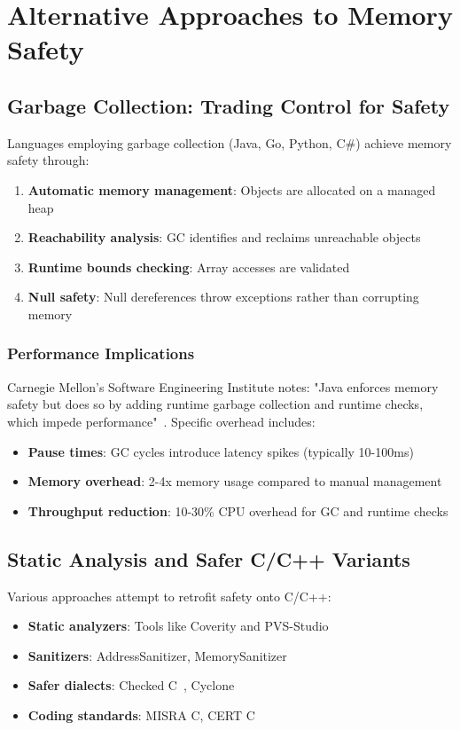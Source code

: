 \documentclass[11pt]{article}
\begin{document}
\section{Alternative Approaches to Memory Safety}

\subsection{Garbage Collection: Trading Control for Safety}

Languages employing garbage collection (Java, Go, Python, C\#) achieve memory safety through:

\begin{enumerate}
    \item \textbf{Automatic memory management}: Objects are allocated on a managed heap
    \item \textbf{Reachability analysis}: GC identifies and reclaims unreachable objects
    \item \textbf{Runtime bounds checking}: Array accesses are validated
    \item \textbf{Null safety}: Null dereferences throw exceptions rather than corrupting memory
\end{enumerate}

\subsubsection{Performance Implications}
Carnegie Mellon's Software Engineering Institute notes: "Java enforces memory safety but does so by adding runtime garbage collection and runtime checks, which impede performance"~\cite{sei2023rust}. Specific overhead includes:

\begin{itemize}
    \item \textbf{Pause times}: GC cycles introduce latency spikes (typically 10-100ms)
    \item \textbf{Memory overhead}: 2-4x memory usage compared to manual management
    \item \textbf{Throughput reduction}: 10-30\% CPU overhead for GC and runtime checks
\end{itemize}

\subsection{Static Analysis and Safer C/C++ Variants}

Various approaches attempt to retrofit safety onto C/C++:
\begin{itemize}
    \item \textbf{Static analyzers}: Tools like Coverity and PVS-Studio
    \item \textbf{Sanitizers}: AddressSanitizer, MemorySanitizer
    \item \textbf{Safer dialects}: Checked C~\cite{checkedc2018}, Cyclone
    \item \textbf{Coding standards}: MISRA C, CERT C
\end{itemize}
\end{document}
